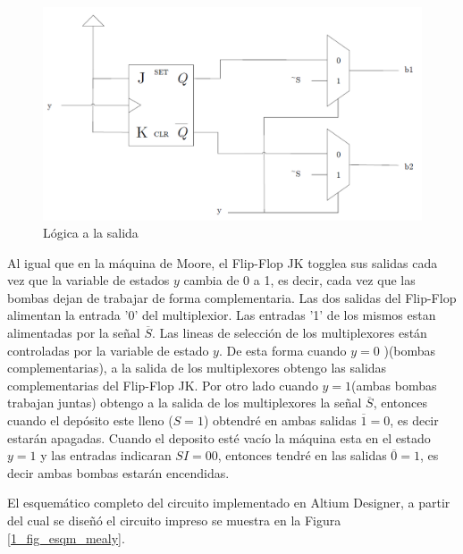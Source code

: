 \documentclass[10pt,a4paper]{article}
\begin{document}
\begin{figure}[H]
\centering
\includegraphics[scale=0.3]{images/multiplexion_mealy.png}
\caption{Lógica a la salida}
\label{1_salida_mealy}
\end{figure}

Al igual que en la máquina de Moore, el Flip-Flop JK togglea sus salidas cada vez que la variable de estados $y$ cambia de 0 a 1, es decir, cada vez que las bombas dejan de trabajar de forma complementaria. Las dos salidas del Flip-Flop alimentan la entrada '0' del multiplexior. Las entradas '1' de los mismos estan alimentadas por la señal $\overline{S}$. Las lineas de selección de los multiplexores están controladas por la variable de estado $y$. De esta forma cuando $y=0$ )(bombas complementarias), a la salida de los multiplexores obtengo las salidas complementarias del Flip-Flop JK. Por otro lado cuando $y=1$(ambas bombas trabajan juntas) obtengo a la salida de los multiplexores la señal $\overline{S}$, entonces cuando el depósito este lleno ($S=1$) obtendré en ambas salidas $\overline{1}=0$, es decir estarán apagadas. Cuando el deposito esté vacío la máquina esta en el estado $y=1$ y las entradas indicaran $SI=00$, entonces tendré en las salidas $\overline{0}=1$, es decir ambas bombas estarán encendidas.

El esquemático completo del circuito implementado en Altium Designer, a partir del cual se diseñó el circuito impreso se muestra en la Figura \ref{1_fig_esqm_mealy}.
\end{document}
